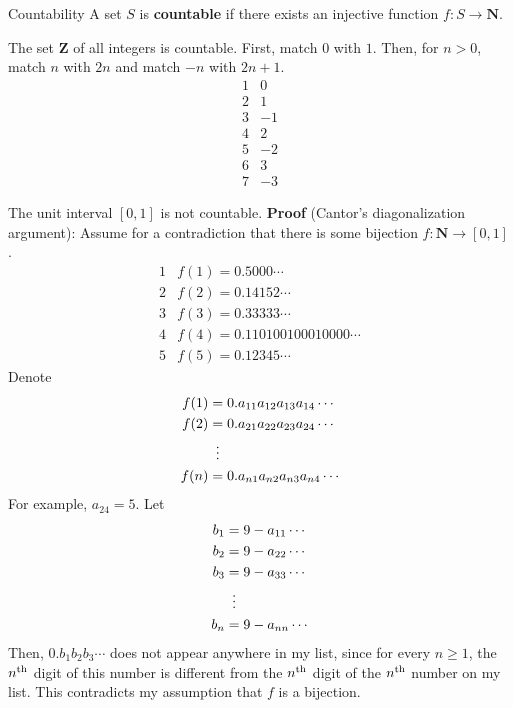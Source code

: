 \begin{Definition}{Countability}{}
    A set $ S $ is \textbf{countable} if there exists an injective function
    $ f\colon S\to\mathbf{N} $.
\end{Definition}
\begin{Example}{}{}
    The set $ \mathbf{Z} $ of all integers is countable.
    First, match $ 0 $ with $ 1 $. Then, for $ n>0 $, match $ n $ with
    $ 2n $ and match $ -n $ with $ 2n+1 $.
    \[ \begin{array}{c|c}
            1 & 0  \\
            \hline
            2 & 1  \\
            \hline
            3 & -1 \\
            \hline
            4 & 2  \\
            \hline
            5 & -2 \\
            \hline
            6 & 3  \\
            \hline
            7 & -3
        \end{array} \]
\end{Example}
\begin{Theorem}{}{}
    The unit interval $ [0,1] $ is not countable.
    \tcblower{}
    \textbf{Proof} (Cantor's diagonalization argument):
    Assume for a contradiction that there is some bijection
    $ f\colon \mathbf{N}\to [0,1] $.
    \[ \begin{array}{c|l}
            1 & f(1)=0.5000\cdots            \\
            \hline
            2 & f(2)=0.14152\cdots           \\
            \hline
            3 & f(3)=0.33333\cdots           \\
            \hline
            4 & f(4)=0.110100100010000\cdots \\
            \hline
            5 & f(5)=0.12345\cdots
        \end{array} \]
    Denote
    \begin{align*}
        f(1) & =0.a_{11}a_{12}a_{13}a_{14}\cdots \\
        f(2) & =0.a_{21}a_{22}a_{23}a_{24}\cdots \\
             & \vdotswithin{=}                   \\
        f(n) & =0.a_{n1}a_{n2}a_{n3}a_{n4}\cdots
    \end{align*}
    For example, $ a_{24}=5 $.
    Let
    \begin{align*}
        b_1 & =9-a_{11}\cdots \\
        b_2 & =9-a_{22}\cdots \\
        b_3 & =9-a_{33}\cdots \\
            & \vdotswithin{=} \\
        b_n & =9-a_{nn}\cdots
    \end{align*}
    Then, $ 0.b_1b_2b_3\cdots $ does not
    appear anywhere in my list, since for every $ n\ge 1 $, the
    $ n\textsuperscript{th} $ digit of this number is different
    from the $ n\textsuperscript{th} $ digit of the
    $ n\textsuperscript{th} $ number on my list. This contradicts
    my assumption that $ f $ is a bijection.
\end{Theorem}
